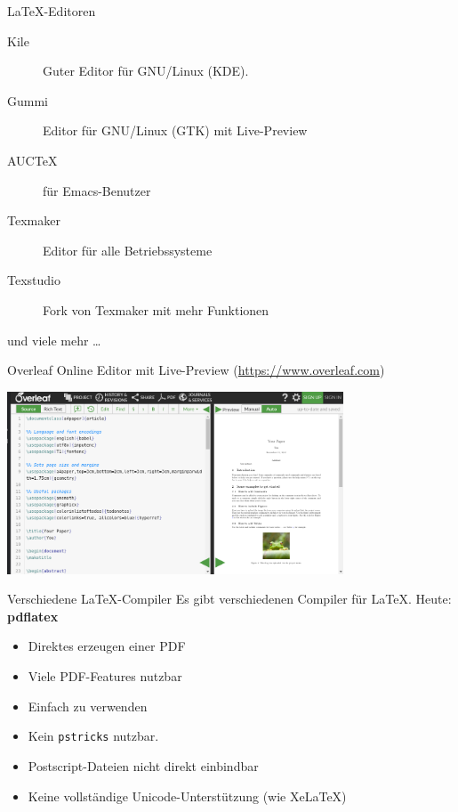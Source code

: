 \documentclass{beamer}
\begin{document}
			
		\begin{frame}{\LaTeX-Editoren}
			\begin{description}
				\item[Kile] Guter Editor für GNU/Linux (KDE).
				\item[Gummi] Editor für GNU/Linux (GTK) mit Live-Preview
				\item[AUCTeX] für Emacs-Benutzer
				\item[Texmaker] Editor für alle Betriebssysteme
				\item[Texstudio] Fork von Texmaker mit mehr Funktionen
			\end{description}
			 und viele mehr \dots
		\end{frame}
		
		
		\begin{frame}{Overleaf}
			Online Editor mit Live-Preview (\url{https://www.overleaf.com})
			
			\begin{center}
				\includegraphics[width=0.75\textwidth]{images/overleaf}
			\end{center}
		\end{frame}
		
		
		\begin{frame}{Verschiedene \LaTeX{}-Compiler}
			Es gibt verschiedenen Compiler für \LaTeX{}. Heute: \textbf{pdflatex}
			\begin{itemize}
				\item Direktes erzeugen einer PDF
				\item Viele PDF-Features nutzbar
				\item Einfach zu verwenden
			\end{itemize}
			\begin{itemize}
				\item Kein \texttt{pstricks} nutzbar.
				\item Postscript-Dateien nicht direkt einbindbar
				\item Keine vollständige Unicode-Unterstützung (wie Xe\LaTeX)
			\end{itemize}
		\end{frame}
		
\end{document}
